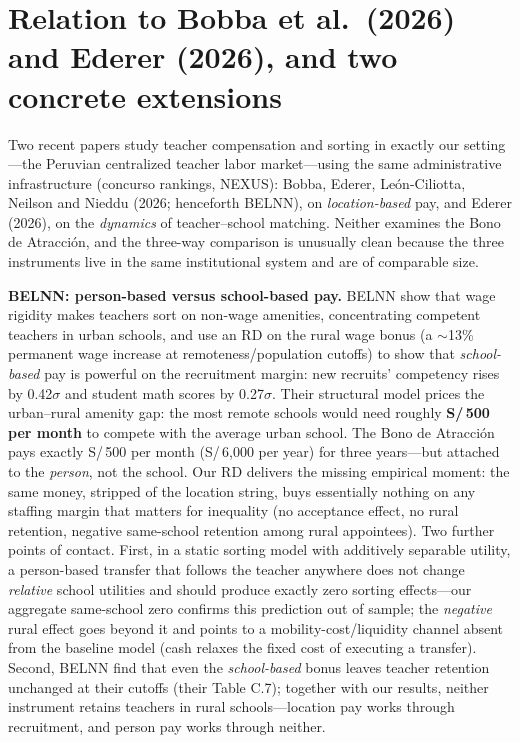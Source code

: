 \documentclass[11pt]{article}
\begin{document}
\section{Relation to Bobba et al.\ (2026) and Ederer (2026), and two
concrete extensions}\label{sec:related}

Two recent papers study teacher compensation and sorting in exactly our
setting---the Peruvian centralized teacher labor market---using the same
administrative infrastructure (concurso rankings, NEXUS): Bobba, Ederer,
Le\'on-Ciliotta, Neilson and Nieddu (2026; henceforth BELNN), on
\emph{location-based} pay, and Ederer (2026), on the \emph{dynamics} of
teacher--school matching. Neither examines the Bono de Atracci\'on, and the
three-way comparison is unusually clean because the three instruments live in
the same institutional system and are of comparable size.

\textbf{BELNN: person-based versus school-based pay.} BELNN show that wage
rigidity makes teachers sort on non-wage amenities, concentrating competent
teachers in urban schools, and use an RD on the rural wage bonus (a
$\sim$13\% permanent wage increase at remoteness/population cutoffs) to show
that \emph{school-based} pay is powerful on the recruitment margin: new
recruits' competency rises by 0.42$\sigma$ and student math scores by
0.27$\sigma$. Their structural model prices the urban--rural amenity gap: the
most remote schools would need roughly \textbf{S/\,500 per month} to compete
with the average urban school. The Bono de Atracci\'on pays exactly
S/\,500 per month (S/\,6,000 per year) for three years---but attached to the
\emph{person}, not the school. Our RD delivers the missing empirical moment:
the same money, stripped of the location string, buys essentially nothing on
any staffing margin that matters for inequality (no acceptance effect, no
rural retention, negative same-school retention among rural appointees). Two
further points of contact. First, in a static sorting model with additively
separable utility, a person-based transfer that follows the teacher anywhere
does not change \emph{relative} school utilities and should produce exactly
zero sorting effects---our aggregate same-school zero confirms this
prediction out of sample; the \emph{negative} rural effect goes beyond it and
points to a mobility-cost/liquidity channel absent from the baseline model
(cash relaxes the fixed cost of executing a transfer). Second, BELNN find
that even the \emph{school-based} bonus leaves teacher retention unchanged at
their cutoffs (their Table C.7); together with our results, neither
instrument retains teachers in rural schools---location pay works through
recruitment, and person pay works through neither.
\end{document}
